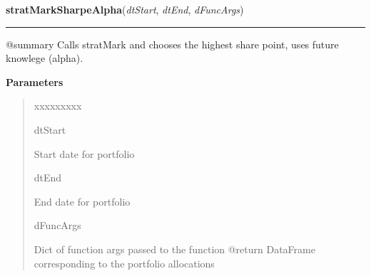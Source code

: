 \hspace{.8\funcindent}\begin{boxedminipage}{\funcwidth}

    \raggedright \textbf{stratMarkSharpeAlpha}(\textit{dtStart}, \textit{dtEnd}, \textit{dFuncArgs})

    \vspace{-1.5ex}

    \rule{\textwidth}{0.5\fboxrule}
\setlength{\parskip}{2ex}
    @summary Calls stratMark and chooses the highest share point, uses 
    future knowlege (alpha).

\setlength{\parskip}{1ex}
      \textbf{Parameters}
      \vspace{-1ex}

      \begin{quote}
        \begin{Ventry}{xxxxxxxxx}

          \item[dtStart]

          Start date for portfolio

          \item[dtEnd]

          End date for portfolio

          \item[dFuncArgs]

          Dict of function args passed to the function @return DataFrame 
          corresponding to the portfolio allocations

        \end{Ventry}

      \end{quote}

    \end{boxedminipage}

    \label{QSTK:qstkstrat:strategies:stratMarkMaxRetAlpha}

    \vspace{0.5ex}


